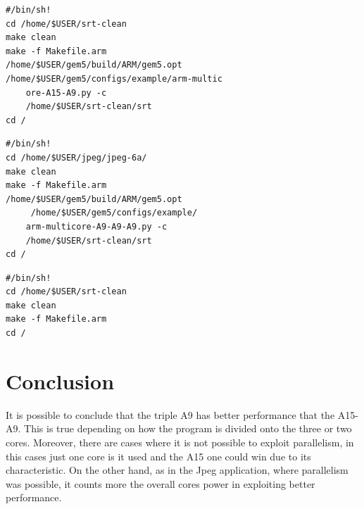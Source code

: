 \documentclass[journal]{IEEEtran}
\begin{document}
\begin{lstlisting}
#/bin/sh!
cd /home/$USER/srt-clean
make clean
make -f Makefile.arm
/home/$USER/gem5/build/ARM/gem5.opt
/home/$USER/gem5/configs/example/arm-multic
	ore-A15-A9.py -c
	/home/$USER/srt-clean/srt
cd /
\end{lstlisting}

\begin{lstlisting}
#/bin/sh!
cd /home/$USER/jpeg/jpeg-6a/
make clean
make -f Makefile.arm
/home/$USER/gem5/build/ARM/gem5.opt
	 /home/$USER/gem5/configs/example/
	arm-multicore-A9-A9-A9.py -c 
	/home/$USER/srt-clean/srt
cd /
\end{lstlisting}


\begin{lstlisting}
#/bin/sh!
cd /home/$USER/srt-clean
make clean
make -f Makefile.arm
cd /
\end{lstlisting}



\section{Conclusion}
It is possible to conclude that the triple A9 has better performance that the A15-A9. This is true depending on how the program is divided onto the three or two cores. Moreover, there are cases where it is not possible to exploit parallelism, in this cases just one core is it used and the A15 one could win due to its characteristic. On the other hand, as in the Jpeg application, where parallelism was possible, it counts more the overall cores power in exploiting better performance. 
\end{document}
